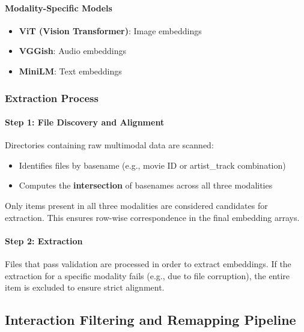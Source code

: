 \paragraph{Modality-Specific Models}
\begin{itemize}
    \item \textbf{ViT (Vision Transformer)}: Image embeddings
    \item \textbf{VGGish}: Audio embeddings
    \item \textbf{MiniLM}: Text embeddings
\end{itemize}



\subsubsection{Extraction Process}

\paragraph{Step 1: File Discovery and Alignment}

Directories containing raw multimodal data are scanned:
\begin{itemize}
    \item Identifies files by basename (e.g., movie ID or artist\_track combination)
    \item Computes the \textbf{intersection} of basenames across all three modalities
\end{itemize}

Only items present in all three modalities are considered candidates for extraction. This ensures row-wise correspondence in the final embedding arrays.


\paragraph{Step 2: Extraction}
Files that pass validation are processed in order to extract embeddings. If the extraction for a specific modality fails (e.g., due to file corruption), the entire item is excluded to ensure strict alignment.



\subsection{Interaction Filtering and Remapping Pipeline}
\label{sec:mapping}

